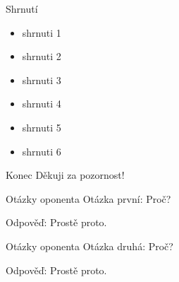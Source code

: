 \documentclass[czech,aspectratio=169]{beamer}
\begin{document}
    \begin{frame}{Shrnutí}
        \begin{itemize}
            \item shrnuti 1
            \item shrnuti 2
            \item shrnuti 3
            \item shrnuti 4
            \item shrnuti 5
            \item shrnuti 6
        \end{itemize}
    
    \end{frame}
    
    \begin{frame}{Konec}
        \center Děkuji za pozornost!
    \end{frame}

    \begin{frame}[noframenumbering]{Otázky oponenta}
        Otázka první: Proč?
    
        \vfill
    
        Odpověď: Prostě proto.
    \end{frame}
    
    \begin{frame}[noframenumbering]{Otázky oponenta}
        Otázka druhá: Proč?
    
        \vfill
    
        Odpověď: Prostě proto.
    \end{frame}
\end{document}
